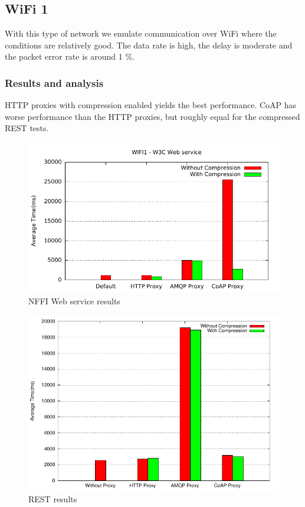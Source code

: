 \subsection{WiFi 1}

With this type of network we emulate communication over WiFi where the
conditions are relatively good. The data rate is high, the delay is moderate
and the packet error rate is around 1 \%.

\subsubsection{Results and analysis}

HTTP proxies with compression enabled yields the best performance. CoAP has
worse performance than the HTTP proxies, but roughly equal for the compressed
REST tests.


\begin{figure}[H]
\center
\includegraphics[scale=0.75]{../results/wifi1/nffi/out.pdf}
\caption{NFFI Web service results}
\end{figure}

\begin{figure}[H]
\center
\includegraphics[scale=0.75]{../results/wifi1/rest/result.pdf}
\caption{REST results}
\end{figure}


